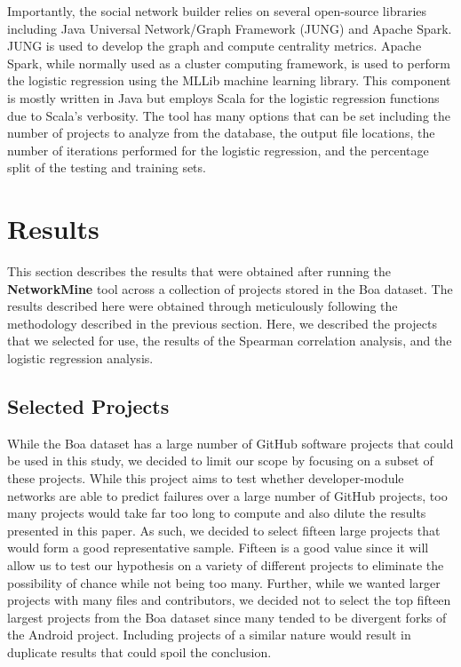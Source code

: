 \documentclass{sig-alternate-05-2015}
\begin{document}
Importantly, the social network builder relies on several open-source libraries including Java Universal Network/Graph Framework (JUNG) and Apache Spark. JUNG is used to develop the graph and compute centrality metrics. Apache Spark, while normally used as a cluster computing framework, is used to perform the logistic regression using the MLLib machine learning library. This component is mostly written in Java but employs Scala for the logistic regression functions due to Scala's verbosity. The tool has many options that can be set including the number of projects to analyze from the database, the output file locations, the number of iterations performed for the logistic regression, and the percentage split of the testing and training sets. 

\section{Results}
\label{results}
This section describes the results that were obtained after running the \textbf{NetworkMine} tool across a collection of projects stored in the Boa dataset. The results described here were obtained through meticulously following the methodology described in the previous section. Here, we described the projects that we selected for use, the results of the Spearman correlation analysis, and the logistic regression analysis.

\subsection{Selected Projects}
While the Boa dataset has a large number of GitHub software projects that could be used in this study, we decided to limit our scope by focusing on a subset of these projects. While this project aims to test whether developer-module networks are able to predict failures over a large number of GitHub projects, too many projects would take far too long to compute and also dilute the results presented in this paper. As such, we decided to select fifteen large projects that would form a good representative sample. Fifteen is a good value since it will allow us to test our hypothesis on a variety of different projects to eliminate the possibility of chance while not being too many. Further, while we wanted larger projects with many files and contributors, we decided not to select the top fifteen largest projects from the Boa dataset since many tended to be divergent forks of the Android project. Including projects of a similar nature would result in duplicate results that could spoil the conclusion.
\end{document}

